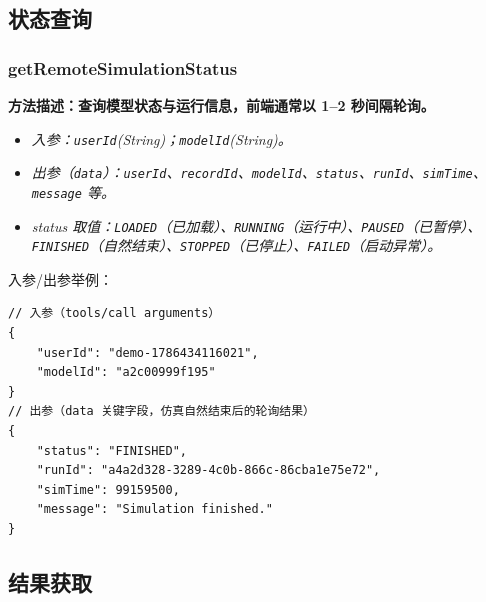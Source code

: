 \subsection{状态查询}
\subsubsection{getRemoteSimulationStatus}
\bf{方法描述}：查询模型状态与运行信息，前端通常以 1--2 秒间隔轮询。
\begin{itemize}
	\item \it{入参}：\texttt{userId}(String)；\texttt{modelId}(String)。
	\item \it{出参}（\texttt{data}）：\texttt{userId}、\texttt{recordId}、\texttt{modelId}、\texttt{status}、\texttt{runId}、\texttt{simTime}、\texttt{message} 等。
	\item \it{status 取值}：\texttt{LOADED}（已加载）、\texttt{RUNNING}（运行中）、\texttt{PAUSED}（已暂停）、\texttt{FINISHED}（自然结束）、\texttt{STOPPED}（已停止）、\texttt{FAILED}（启动异常）。
\end{itemize}
入参/出参举例：
\begin{lstlisting}
// 入参（tools/call arguments）
{
    "userId": "demo-1786434116021",
    "modelId": "a2c00999f195"
}
// 出参（data 关键字段，仿真自然结束后的轮询结果）
{
    "status": "FINISHED",
    "runId": "a4a2d328-3289-4c0b-866c-86cba1e75e72",
    "simTime": 99159500,
    "message": "Simulation finished."
}
\end{lstlisting}\vspace{-30pt}

\subsection{结果获取}
